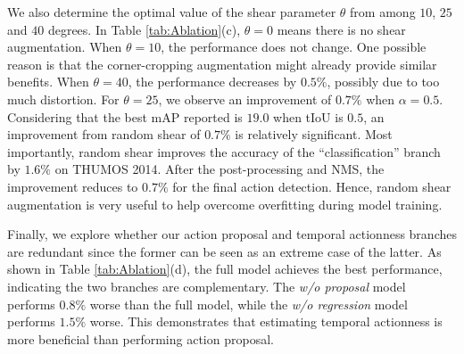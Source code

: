\documentclass[10pt,twocolumn,letterpaper]{article}
\begin{document}
We also determine the optimal value of the shear parameter $\theta$ from among $10$, $25$ and $40$ degrees. In Table \ref{tab:Ablation}(c), $\theta=0$ means there is no shear augmentation. When $\theta=10$, the performance does not change. One possible reason is that the corner-cropping augmentation might already provide similar benefits. When $\theta=40$, the performance decreases by $0.5\%$, possibly due to too much distortion. For $\theta=25$, we observe an improvement of $0.7\%$ when $\alpha=0.5$. Considering that the best mAP reported is $19.0$ when tIoU is $0.5$, an improvement from random shear of $0.7\%$ is relatively significant. Most importantly, random shear improves the accuracy of the ``classification'' branch by $1.6\%$ on THUMOS 2014. After the post-processing and NMS, the improvement reduces to $0.7\%$ for the final action detection. Hence, random shear augmentation is very useful to help overcome overfitting during model training. 


Finally, we explore whether our action proposal and temporal actionness branches are redundant since the former can be seen as an extreme case of the latter. As shown in Table \ref{tab:Ablation}(d), the full model achieves the best performance, indicating the two branches are complementary. The \textit{w/o proposal} model performs $0.8\%$ worse than the full model, while the \textit{w/o regression} model performs $1.5\%$ worse. This demonstrates that estimating temporal actionness is more beneficial than performing action proposal.
\end{document}
